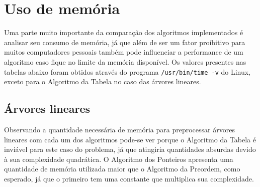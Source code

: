 \section{Uso de memória}

Uma parte muito importante da comparação dos algoritmos implementados é analisar seu
consumo de memória, já que além de ser um fator proibitivo para muitos computadores
pessoais também pode influenciar a performance de um algoritmo caso fique no limite
da memória disponível. Os valores presentes nas tabelas abaixo foram obtidos através
do programa \texttt{/usr/bin/time -v} do Linux, exceto para o Algoritmo da Tabela
no caso das árvores lineares.

\subsection{Árvores lineares}
Observando a quantidade necessária de memória para preprocessar árvores lineares com
cada um dos algoritmos pode-se ver porque o Algoritmo da Tabela é inviável para este
caso do problema, já que atingiria quantidades absurdas devido à sua complexidade
quadrática. O Algoritmo dos Ponteiros apresenta uma quantidade de memória utilizada
maior que o Algoritmo da Preordem, como esperado, já que o primeiro tem uma constante
que multiplica sua complexidade.

